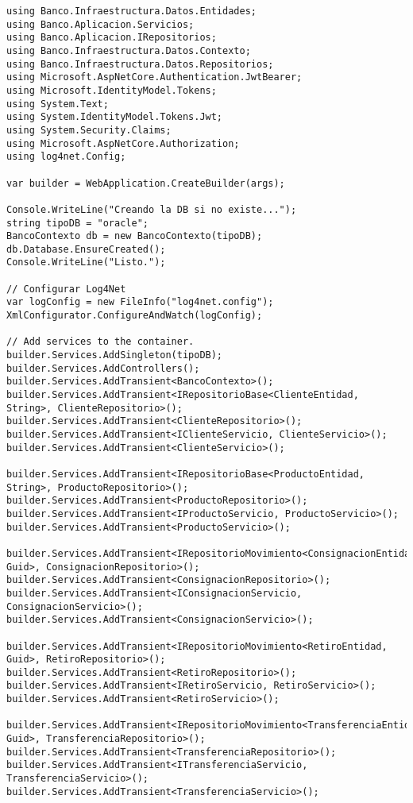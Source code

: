 \documentclass[executivepaper]{article}
\begin{document}
\begin{lstlisting}
using Banco.Infraestructura.Datos.Entidades;
using Banco.Aplicacion.Servicios;
using Banco.Aplicacion.IRepositorios;
using Banco.Infraestructura.Datos.Contexto;
using Banco.Infraestructura.Datos.Repositorios;
using Microsoft.AspNetCore.Authentication.JwtBearer;
using Microsoft.IdentityModel.Tokens;
using System.Text;
using System.IdentityModel.Tokens.Jwt;
using System.Security.Claims;
using Microsoft.AspNetCore.Authorization;
using log4net.Config;

var builder = WebApplication.CreateBuilder(args);

Console.WriteLine("Creando la DB si no existe...");
string tipoDB = "oracle";
BancoContexto db = new BancoContexto(tipoDB);
db.Database.EnsureCreated();
Console.WriteLine("Listo.");

// Configurar Log4Net
var logConfig = new FileInfo("log4net.config");
XmlConfigurator.ConfigureAndWatch(logConfig);

// Add services to the container.
builder.Services.AddSingleton(tipoDB);
builder.Services.AddControllers();
builder.Services.AddTransient<BancoContexto>();
builder.Services.AddTransient<IRepositorioBase<ClienteEntidad, String>, ClienteRepositorio>();
builder.Services.AddTransient<ClienteRepositorio>();
builder.Services.AddTransient<IClienteServicio, ClienteServicio>();
builder.Services.AddTransient<ClienteServicio>();

builder.Services.AddTransient<IRepositorioBase<ProductoEntidad, String>, ProductoRepositorio>();
builder.Services.AddTransient<ProductoRepositorio>();
builder.Services.AddTransient<IProductoServicio, ProductoServicio>();
builder.Services.AddTransient<ProductoServicio>();

builder.Services.AddTransient<IRepositorioMovimiento<ConsignacionEntidad, Guid>, ConsignacionRepositorio>();
builder.Services.AddTransient<ConsignacionRepositorio>();
builder.Services.AddTransient<IConsignacionServicio, ConsignacionServicio>();
builder.Services.AddTransient<ConsignacionServicio>();

builder.Services.AddTransient<IRepositorioMovimiento<RetiroEntidad, Guid>, RetiroRepositorio>();
builder.Services.AddTransient<RetiroRepositorio>();
builder.Services.AddTransient<IRetiroServicio, RetiroServicio>();
builder.Services.AddTransient<RetiroServicio>();

builder.Services.AddTransient<IRepositorioMovimiento<TransferenciaEntidad, Guid>, TransferenciaRepositorio>();
builder.Services.AddTransient<TransferenciaRepositorio>();
builder.Services.AddTransient<ITransferenciaServicio, TransferenciaServicio>();
builder.Services.AddTransient<TransferenciaServicio>();


\end{lstlisting}
\end{document}
